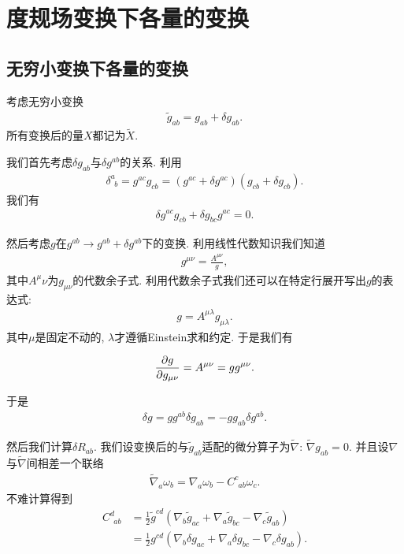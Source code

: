 \section{度规场变换下各量的变换}
\subsection{无穷小变换下各量的变换}\label{inf-transf}
考虑无穷小变换
\begin{align}
    \tilde{g}_{ab}=g_{ab}+\delta g_{ab}.
\end{align}
所有变换后的量$X$都记为$\tilde X$.

我们首先考虑$\delta g_{ab}$与$\delta g^{ab}$的关系. 利用
\begin{align}
    \delta^a_{~~b}=g^{ac}g_{cb}=(g^{ac}+\delta g^{ac})(g_{cb}+\delta g_{cb}).
\end{align}
我们有
\begin{align}
    \delta g^{ac}g_{cb}+\delta g_{bc} g^{ac}=0.
\end{align}

然后考虑$g$在$g^{ab}\to g^{ab}+\delta g^{ab}$下的变换. 利用线性代数知识我们知道
\begin{align}
    g^{\mu\nu}=\frac{A^{\mu\nu}}{g},
\end{align}
其中$A^\mu\nu$为$g_{\mu\nu}$的代数余子式. 利用代数余子式我们还可以在特定行展开写出$g$的表达式:
\begin{align}
    g=A^{\mu\lambda}g_{\mu\lambda}.
\end{align}
其中$\mu$是固定不动的, $\lambda$才遵循Einstein求和约定. 于是我们有

\begin{align}
    \frac{\partial g}{\partial g_{\mu\nu}}=A^{\mu\nu}=g g^{\mu\nu}.
\end{align}

于是
\begin{align}
    \delta g=g g^{ab}\delta g_{ab}=-g g_{ab}\delta g^{ab}.
\end{align}

然后我们计算$\delta R_{ab}$. 我们设变换后的与$\tilde g_{ab}$适配的微分算子为$\tilde\nabla$: $\tilde\nabla g_{ab}=0$. 并且设$\nabla$与$\tilde\nabla$间相差一个联络
\begin{align}
    \tilde\nabla_a\omega_b=\nabla_a\omega_b-C^{c}_{~~ab}\omega_c.
\end{align}
不难计算得到
\begin{align}
    C^{d}_{~~ab}&=\frac12\tilde g^{cd}\left(\nabla_b\tilde g_{ac}+\nabla_a\tilde g_{bc}-\nabla_c\tilde g_{ab}\right)\\
    &=\frac12g^{cd}\left(\nabla_b\delta g_{ac}+\nabla_a\delta g_{bc}-\nabla_c\delta g_{ab}\right).
\end{align}

